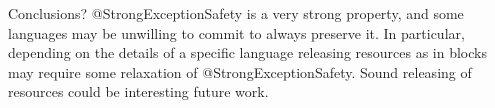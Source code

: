 Conclusions?
@StrongExceptionSafety is 
a very strong property,
and some languages may be unwilling to commit to always preserve it.
In particular, depending on the details of a specific language
 releasing resources as in \Q@finally@ blocks may require
some relaxation of @StrongExceptionSafety. Sound releasing of resources could be interesting
future work.


%
%
